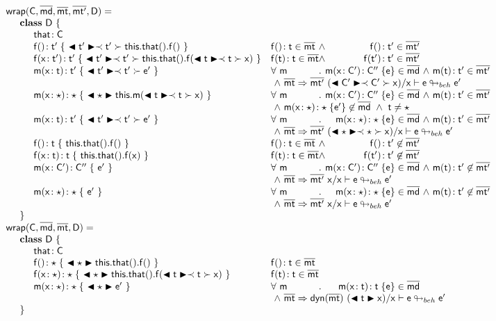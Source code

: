 \documentclass[a4paper,USenglish]{tex/lipics-v2016}
\begin{document}
\[\begin{array}{@{}ll@{}l@{}r@{~}c@{~}r}
    \wrap\C{\b\md}\bmt\bmtp\D = \\
\SP \class ~\D ~ \{\\
\SPP \Fdef\that\C \\
\SPP \Mdefz\f{\tp}{~\bscast\tp{\Get{\Get\this\that}\f}~}
&    \Mtype\f{}\t\in\bmt &\wedge& \Mtype\f{}\tp \in \bmtp
\\
\SPP \Mdef\f\x\tp\tp {~\bscast\tp{\Set{\Get\this\that}\f{\bscast\t\x}}~}
&    \Mtype\f\t\t \in \bmt &\wedge& \Mtype\f\tp\tp \in \bmtp
\\
\SPP \Mdef\m\x\t\tp {~\bscast\tp{{\ep}}~}
&     \All \m \Mdef\m\x\Cp\Cpp\e\in\b\md &\wedge& \Mtype\m\t\tp\in\bmtp \\
&\multicolumn{5}{l}{~\wedge~\rtranst{\bmt}\bmtp{(\bscast\Cp\x)}\x{\e}{\ep}}
\\
\SPP \Mdef\m\x\any\any {~\BehCast\any{\Call\this\m{\bscast{\t}\x}}~}
&     \All \m \Mdef\m\x\Cp\Cpp\e\in\b\md &\wedge& \Mtype\m\t\tp\in\bmtp\\
&\multicolumn{5}{l}{~\wedge~\Mdef\m\x\any\any{\e'}\not\in\b\md~\wedge~\t\neq\any}
\\
\SPP \Mdef\m\x\t\tp{~\bscast\tp{\ep}~}
&    \All \m \Mdef\m\x\any\any\e\in\b\md &\wedge& \Mtype\m\t\tp\in\bmtp \\
&\multicolumn{5}{l}{~\wedge~\rtranst{\bmt}\bmtp{(\bscast\any\x)}\x\e{\ep}}
\\
\SPP \Mdefz\f\t { ~\Get{\Get\this\that}\f~}
&    \Mtype\f{}\t \in \bmt &\wedge& \Mtype\f{}\tp \not\in \bmtp
\\
\SPP \Mdef\f\x\t\t { ~\Set{\Get\this\that}\f\x~}
&    \Mtype\f\t\t \in \bmt&\wedge& \Mtype\f\tp\tp \not\in \bmtp
\\
\SPP \Mdef\m\x{\Cp}{\Cpp} {~\ep~}
&    \All \m  \Mdef\m\x\Cp\Cpp\e\in\b\md &\wedge& \Mtype\m\t\tp\not\in \bmtp \\
&\multicolumn{5}{l}{~\wedge~\rtranst{\bmt}\bmtp\x\x{\e}{\ep}}
\\
\SPP \Mdef\m\x\any\any {~\ep~}
&    \All \m  \Mdef\m\x\any\any\e\in\b\md  &\wedge& \Mtype\m\t\tp\not\in\bmtp \\
&\multicolumn{5}{l}{~\wedge~\rtranst{\bmt}\bmtp\x\x{\e}{\ep}}
\\
\SP \}
\\
\wrapAny\C\bmd\bmt\D = \\
\SP \class~\D~\{\\
\SPP \Fdef \that \C\\ 
\SPP   \Mdefz\f\any{~\BehCast\any{\Get{{\Get\this\that}}\f}~}
&  \Mtype\f{}\t \in \bmt\\
\SPP   \Mdef\f\x\any\any{~\BehCast\any{\Set{\Get\this\that}\f{\bscast\t\x}}~}
&  \Mtype\f\t\t \in \bmt\\
\SPP   \Mdef\m\x\any\any {~\BehCast\any{{\ep}}~}
&  \All \m \Mdef\m\x\t\t\e\in\b\md \\
&\multicolumn{5}{l}{~\wedge~\rtranst{\bmt}{\dyn{\bmt}}{(\BehCast\t\x)}\x{\e}{\ep}}
\\
\SP \}\\
\end{array}\]
\end{document}
